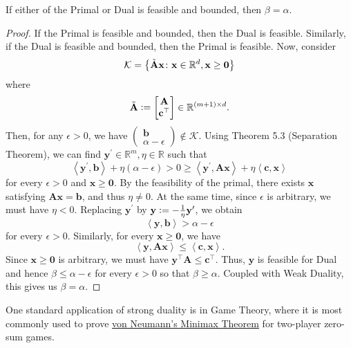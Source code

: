 \begin{thm}
    If either of the Primal or Dual is feasible and bounded, then $\beta = \alpha$. 
\end{thm}
\begin{proof}
    If the Primal is feasible and bounded, then the Dual is feasible. Similarly, if the Dual is feasible and bounded, then the Primal is feasible. Now, consider
    \[
        \mathcal{K} = \left\{ \Tilde{\mathbf{A}}\mathbf{x} \colon \mathbf{x} \in \mathbb{R}^d, \mathbf{x} \geq \mathbf{0} \right\}
    \]
    where
    \[
        \Tilde{\mathbf{A}} \vcentcolon= \begin{bmatrix}
            \mathbf{A} \\ \mathbf{c}^{\top} 
        \end{bmatrix} \in \mathbb{R}^{(m+1) \times d}.
    \]
    Then, for any $\epsilon > 0$, we have $\begin{pmatrix}
        \mathbf{b} \\ \alpha - \epsilon
    \end{pmatrix} \notin \mathcal{K}$. Using Theorem 5.3 (Separation Theorem), we can find $\mathbf{y}^{\prime} \in \mathbb{R}^m, \eta \in \mathbb{R}$ such that
    \[
        \left\langle \mathbf{y}^{\prime}, \mathbf{b} \right\rangle + \eta(\alpha - \epsilon) > 0 \geq \left\langle \mathbf{y}^{\prime}, \mathbf{Ax} \right\rangle + \eta \left\langle \mathbf{c}, \mathbf{x} \right\rangle
    \]
    for every $\epsilon > 0$ and $\mathbf{x} \geq \mathbf{0}$. By the feasibility of the primal, there exists $\mathbf{x}$ satisfying $\mathbf{Ax} = \mathbf{b}$, and thus $\eta \neq 0$. At the same time, since $\epsilon$ is arbitrary, we must have $\eta < 0$. Replacing $\mathbf{y}^{\prime}$ by $\mathbf{y} \vcentcolon= -\frac{1}{\eta} \mathbf{y}^{\prime}$, we obtain
    \[
        \left\langle \mathbf{y}, \mathbf{b} \right\rangle > \alpha - \epsilon
    \]
    for every $\epsilon > 0$. Similarly, for every $\mathbf{x} \geq \mathbf{0}$, we have
    \[
        \left\langle \mathbf{y}, \mathbf{Ax} \right\rangle \leq \left\langle \mathbf{c}, \mathbf{x} \right\rangle. 
    \]
    Since $\mathbf{x} \geq \mathbf{0}$ is arbitrary, we must have $\mathbf{y}^{\top}\mathbf{A} \leq \mathbf{c}^{\top}$. Thus, $\mathbf{y}$ is feasible for Dual and hence $\beta \leq \alpha - \epsilon$ for every $\epsilon > 0$ so that $\beta \geq \alpha$. Coupled with Weak Duality, this gives us $\beta = \alpha$. 
\end{proof} 

One standard application of strong duality is in Game Theory, where it is most commonly used to prove \href{https://en.wikipedia.org/wiki/Minimax_theorem}{von Neumann's Minimax Theorem} for two-player zero-sum games. 

